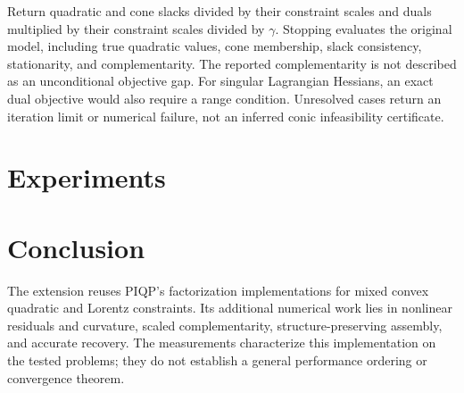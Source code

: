\documentclass[conference]{IEEEtran}
\begin{document}
Return quadratic and cone slacks divided by their constraint scales and duals multiplied by their constraint scales divided by $\gamma$. Stopping evaluates the original model, including true quadratic values, cone membership, slack consistency, stationarity, and complementarity. The reported complementarity is not described as an unconditional objective gap. For singular Lagrangian Hessians, an exact dual objective would also require a range condition. Unresolved cases return an iteration limit or numerical failure, not an inferred conic infeasibility certificate.

\section{Experiments}


\newpage
\section{Conclusion}
The extension reuses PIQP's factorization implementations for mixed convex quadratic and Lorentz constraints. Its additional numerical work lies in nonlinear residuals and curvature, scaled complementarity, structure-preserving assembly, and accurate recovery. The measurements characterize this implementation on the tested problems; they do not establish a general performance ordering or convergence theorem.



\end{document}
